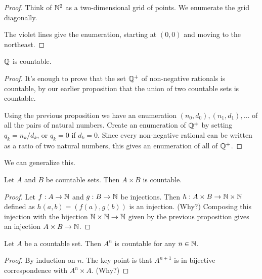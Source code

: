 \documentclass[10pt]{amsart}
\begin{document}
\begin{proof}
Think of $\mathbb{N}^2$ as a two-dimensional grid of points. We enumerate the grid diagonally.

\begin{center}

\end{center}
The violet lines give the enumeration, starting at $(0,0)$ and moving to the northeast. \qedhere
\end{proof}

\begin{proposition}
$\mathbb{Q}$ is countable.
\end{proposition}

\begin{proof}
It's enough to prove that the set $\mathbb{Q}^+$ of non-negative rationals is countable, by our earlier proposition that the union of two countable sets is countable.

Using the previous proposition we have an enumeration $(n_0,d_0), (n_1,d_1), \ldots$ of all the pairs of natural numbers. Create an enumeration of $\mathbb{Q}^+$ by setting $q_k = n_k/d_k$, or $q_k = 0$ if $d_k = 0$. Since every non-negative rational can be written as a ratio of two natural numbers, this gives an enumeration of all of $\mathbb{Q}^+$. 
\end{proof}

We can generalize this.

\begin{proposition}
Let $A$ and $B$ be countable sets. Then $A \times B$ is countable.
\end{proposition}

\begin{proof}
Let $f : A \to \mathbb{N}$ and $g : B \to \mathbb{N}$ be injections. Then $h : A \times B \to \mathbb{N} \times \mathbb{N}$ defined as $h(a,b) = (f(a),g(b))$ is an injection. (Why?) Composing this injection with the bijection $\mathbb{N} \times \mathbb{N} \to \mathbb{N}$ given by the previous proposition gives an injection $A \times B \to \mathbb{N}$.
\end{proof}

\begin{corollary}
Let $A$ be a countable set. Then $A^n$ is countable for any $n \in \mathbb{N}$.
\end{corollary}

\begin{proof}
By induction on $n$. The key point is that $A^{n+1}$ is in bijective correspondence with $A^n \times A$. (Why?)
\end{proof}
\end{document}
